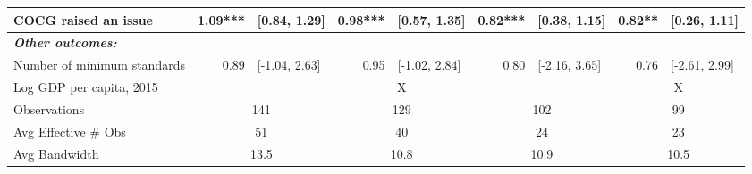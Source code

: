 \begin{adjustbox}{max width=\textwidth}
\begin{tabular}{l*{4}{r@{\hspace{3pt}}l}}
\hspace{.4cm} COCG raised an issue& 1.09*** & [0.84, 1.29] & 0.98*** & [0.57, 1.35] & 0.82*** & [0.38, 1.15] & 0.82** & [0.26, 1.11] \\
\midrule \emph{{\bf Other outcomes: }}&&&&&&&&\\
\hspace{.4cm} Number of minimum standards& 0.89 & [-1.04, 2.63] & 0.95 & [-1.02, 2.84] & 0.80 & [-2.16, 3.65] & 0.76 & [-2.61, 2.99] \\
\midrule Log GDP per capita, 2015&\multicolumn{2}{c}{}&\multicolumn{2}{c}{X}&\multicolumn{2}{c}{}&\multicolumn{2}{c}{X}\\
Observations&\multicolumn{2}{c}{141}&\multicolumn{2}{c}{129}&\multicolumn{2}{c}{102}&\multicolumn{2}{c}{99}\\
Avg Effective \# Obs&\multicolumn{2}{c}{51}&\multicolumn{2}{c}{40}&\multicolumn{2}{c}{24}&\multicolumn{2}{c}{23}\\
Avg Bandwidth&\multicolumn{2}{c}{13.5}&\multicolumn{2}{c}{10.8}&\multicolumn{2}{c}{10.9}&\multicolumn{2}{c}{10.5}\\
\bottomrule
\end{tabular}
\end{adjustbox}
